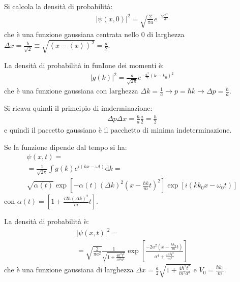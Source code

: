 Si calcola la densità di probabilità:
\begin{equation}\begin{split}
|\psi \left(x,0\right)|^2=\sqrt{\frac{2}{\pi a}}e^{-2\frac{x^2}{a^2}}
\end{split}\end{equation}
che è una funzione gaussiana centrata nello $0$ di larghezza $\Delta x=\frac{b}{\sqrt{2}}\equiv \sqrt{\left\langle x-\left\langle x \right\rangle \right\rangle^2}=\frac{a}{2}$.

La densità di probabilità in funIone dei momenti è:
\begin{equation}\begin{split}
|g\left(k\right)|^2=\frac{a}{\sqrt{2\pi}}e^{-\frac{a^2}{2}\left(k-k_0\right)^2}
\end{split}\end{equation}
che è una funzione gaussiana con larghezza $\Delta k=\frac{1}{a} \rightarrow p=\hbar k \rightarrow \Delta p=\frac{\hbar }{a}$.

Si ricava quindi il primcipio di imderminazione:
\begin{equation}\begin{split}
\Delta p\Delta x=\frac{\hbar }{a}\frac{a}{2}=\frac{\hbar }{2}
\end{split}\end{equation}
e quindi il paccetto gaussiano è il pacchetto di minima indeterminazione.

Se la funzione dipende dal tempo si ha:
\begin{equation}\begin{split}
\psi \left(x,t\right)=\\
=\frac{1}{\sqrt{2\pi}}\int{g\left(k\right)e^{i\left(kx-\omega t\right)}\textrm{d}k}=\\
\sqrt{\alpha\left(t\right)}\exp{\left[-\alpha\left(t\right)\left(\Delta k\right)^2\left(x-\frac{\hbar k}{m}t\right)^2\right]}\exp{\left[i\left(kk_0x-\omega _0t\right)\right]}
\end{split}\end{equation}
con $\alpha\left(t\right)=\left[1+\frac{i2\hbar \left(\Delta k\right)^2}{m}t\right]$.

La densità di probabilità è:
\begin{equation}\begin{split}
|\psi \left(x,t\right)|^2=\\
=\sqrt{\frac{2}{\pi a^2}}\frac{1}{\sqrt{1+\frac{4\hbar ^2t^2}{m^2a^4}}}\exp{\left[\frac{-2a^2\left(x-\frac{\hbar k_0}{m}t\right)}{a^4+\frac{4\hbar ^2t^2}{m^2}}\right]}
\end{split}\end{equation}
che è una funzione gaussiana di larghezza $\Delta x=\frac{a}{2}\sqrt{1+\frac{4\hbar ^2t^2}{m^2a^4}}$ e $V_0=\frac{\hbar k_0}{m}$.

